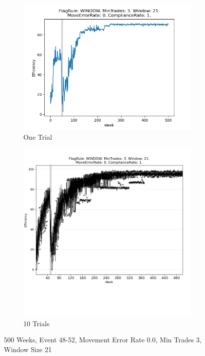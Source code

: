 \documentclass{article}%
\begin{document}
\begin{figure}[!htb]%
\begin{subfigure}[b]{0.45\linewidth}%
\includegraphics[width=\linewidth]{1057fr_WINDOW_mt_3_ws_21_er_0_cr_1_t1.png}%
\caption{One Trial}%
\end{subfigure}%
\begin{subfigure}[b]{0.45\linewidth}%
\includegraphics[clip,width=\linewidth,trim=0 4cm 0 0]{1057fr_WINDOW_mt_3_ws_21_er_0_cr_1_t10.png}%
\caption{10 Trials}%
\end{subfigure}%
\caption{500 Weeks, Event 48{-}52, Movement Error Rate 0.0, Min Trades 3, Window Size 21}%
\end{figure}
\end{document}
